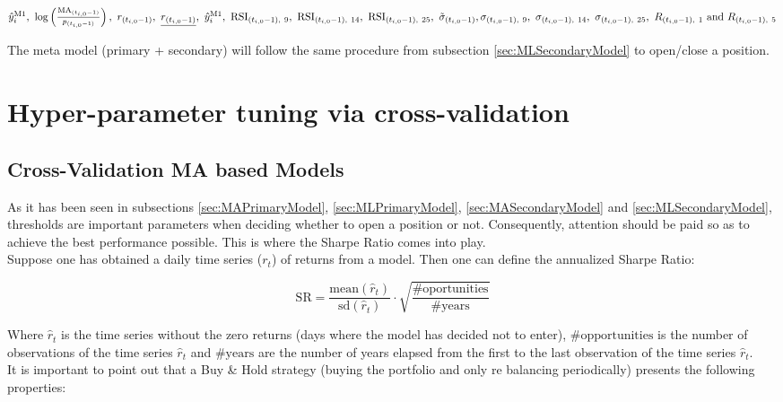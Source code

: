 \documentclass[a4paper]{article}
\begin{document}
$\hat{y}_i^{\text{M1}},\
\log \left( \frac{\text{MA}_{(t_{i,0}-1)}}{p_{(t_{i,0}-1)}} \right),\
r_{(t_{i,0}-1)},\
\underline{r_{(t_{i,0}-1)}},\
\hat{y}_i^{\text{M1}},\
\text{RSI}_{(t_{i,0}-1),\ 9},\
\text{RSI}_{(t_{i,0}-1),\ 14},\
\text{RSI}_{(t_{i,0}-1),\ 25},\
\tilde{\sigma}_{(t_{i,0}-1)},\\
\sigma_{(t_{i,0}-1),\ 9},\
\sigma_{(t_{i,0}-1),\ 14},\
\sigma_{(t_{i,0}-1),\ 25},\
R_{(t_{i,0}-1),\ 1} \text{ and } R_{(t_{i,0}-1),\ 5}$


\vspace{.5cm}

The meta model (primary + secondary) will follow the same procedure 
from subsection \ref{sec:MLSecondaryModel} to open/close a position.

\section{Hyper-parameter tuning via cross-validation}
\subsection{Cross-Validation MA based Models}
As it has been seen in subsections \ref{sec:MAPrimaryModel}, 
\ref{sec:MLPrimaryModel}, \ref{sec:MASecondaryModel} and 
\ref{sec:MLSecondaryModel}, thresholds are important parameters when 
deciding whether to open a position or not. Consequently, attention 
should be paid so as to achieve the best performance possible. This is 
where the Sharpe Ratio comes into play.\\

Suppose one has obtained a daily time series ($r_t$) of returns from a 
model. Then one can define the annualized Sharpe Ratio:

\begin{equation}
	\text{SR} = \frac{\text{mean}(\hat{r}_t)}{\text{sd}(\hat{r}_t)} 
	\cdot \sqrt{\frac{\# \text{oportunities}}{\# \text{years}}}
\end{equation} 

Where $\hat{r}_t$ is the time series without the zero returns (days 
where the model has decided not to enter), $\#\text{opportunities}$ is 
the number of observations of the time series $\hat{r}_t$ and 
$\# \text{years}$ are the number of years elapsed from the first to 
the last observation of the time series $\hat{r}_t$.\\

It is important to point out that a Buy \& Hold strategy (buying the 
portfolio and only re balancing periodically) presents the following 
properties: 
\end{document}
